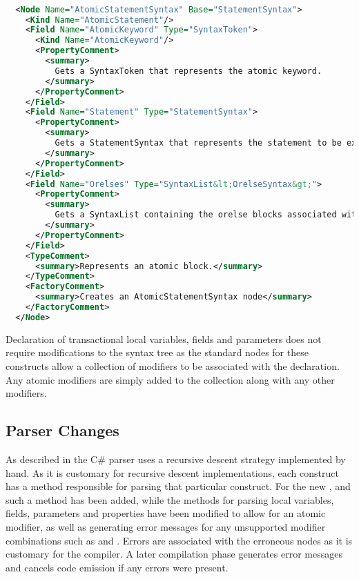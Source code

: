\begin{lstlisting}[label=lst:roslyn_extension_tre_xml,
  caption={AtomicStatement \ac{XML} definition},
  language=XML,  
  showspaces=false,
  showtabs=false,
  breaklines=true,
  showstringspaces=false,
  breakatwhitespace=true,
  escapechar=~,
  morekeywords={Name, Base, Type}]  % Start your code-block

  <Node Name="AtomicStatementSyntax" Base="StatementSyntax">
    <Kind Name="AtomicStatement"/>
    <Field Name="AtomicKeyword" Type="SyntaxToken">
      <Kind Name="AtomicKeyword"/>
      <PropertyComment>
        <summary>
          Gets a SyntaxToken that represents the atomic keyword.
        </summary>
      </PropertyComment>
    </Field>
    <Field Name="Statement" Type="StatementSyntax">
      <PropertyComment>
        <summary>
          Gets a StatementSyntax that represents the statement to be executed when the condition is true.
        </summary>
      </PropertyComment>
    </Field>
    <Field Name="Orelses" Type="SyntaxList&lt;OrelseSyntax&gt;">
      <PropertyComment>
        <summary>
          Gets a SyntaxList containing the orelse blocks associated with the atomic statement.
        </summary>
      </PropertyComment>
    </Field>
    <TypeComment>
      <summary>Represents an atomic block.</summary>
    </TypeComment>
    <FactoryComment>
      <summary>Creates an AtomicStatementSyntax node</summary>
    </FactoryComment>
  </Node>
\end{lstlisting}

Declaration of transactional local variables, fields and parameters does not require modifications to the syntax tree as the standard nodes for these constructs allow a collection of modifiers to be associated with the declaration. Any atomic modifiers are simply added to the collection along with any other modifiers. 


\subsection{Parser Changes}
As described in  the C\# parser uses a recursive descent strategy implemented by hand. As it is customary for recursive descent implementations, each construct has a method responsible for parsing that particular construct. For the new ,  and  such a method has been added, while the methods for parsing local variables, fields, parameters and properties have been modified to allow for an atomic modifier, as well as generating error messages for any unsupported modifier combinations such as  and . Errors are associated with the erroneous nodes as it is customary for the compiler. A later compilation phase generates error messages and cancels code emission if any errors were present.

